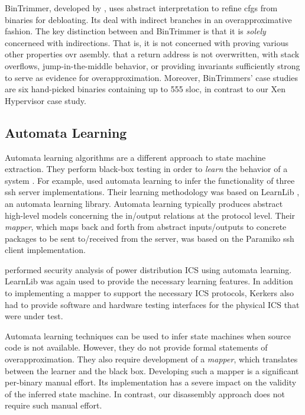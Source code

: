 BinTrimmer, developed by \textcite{redini2019b}, uses abstract interpretation to refine \acp{cfg} from binaries for debloating.
Its deal with indirect branches in an overapproximative fashion.
The key distinction between  and BinTrimmer is that it is \emph{solely} concerneed with indirections.
That is, it is not concerned with proving various other properties ovr asembly.
that a return address is not overwritten, with stack overflows, jump-in-the-middle behavior, or providing invariants sufficiently strong to serve as evidence for overapproximation.
Moreover, BinTrimmers' case studies are six hand-picked binaries containing up to \num{555} \ac{sloc}, in contrast to our Xen Hypervisor case study.

\subsection{Automata Learning}
Automata learning algorithms are a different approach to state machine extraction.
They perform black-box testing in order to \emph{learn} the behavior of a system \autocite{steffen2011active}.
For example, \textcite{fiter2017ssh} used automata learning to infer the functionality of three \ac{ssh} server implementations.
Their learning methodology was based on LearnLib \autocite{raffelt2005learnlib}, an automata learning library.
Automata learning typically produces abstract high-level models concerning the in/output relations at the protocol level.
Their \emph{mapper}, which maps back and forth from abstract inputs/outputs to concrete packages to be sent to/received from the server,
was based on the Paramiko
\ac{ssh} client implementation.

\Textcite{kerkers2017assessing} performed security analysis
of power distribution ICS using automata learning.
LearnLib was again used to provide the necessary learning features.
In addition to implementing a mapper to support the necessary ICS
protocols, Kerkers also had to provide software and hardware testing interfaces for the physical ICS that were under test.

Automata learning techniques can be used to infer state machines when source code is not available.
However, they do not provide formal statements of overapproximation.
They also require development of a \emph{mapper}, which translates between the learner and the black box.
Developing such a mapper is a significant per-binary manual effort.
Its implementation has a severe impact on the validity of the inferred state machine.
In contrast, our disassembly approach does not require such manual effort.


